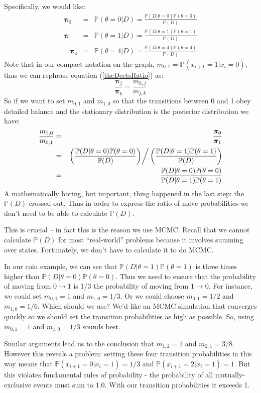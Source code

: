 \documentclass[11pt]{article}
\renewcommand{\Pr}{{\mathbb P}}
\begin{document}
Specifically, we would like:
\begin{eqnarray*}
	\bm \pi_0 & = & \Pr(\theta=0|D) =  \frac{\Pr(D|\theta=0)\Pr(\theta=0)}{\Pr(D)} \\
	\bm \pi_1 & = & \Pr(\theta=1|D) =  \frac{\Pr(D|\theta=1)\Pr(\theta=1)}{\Pr(D)} \\
	\ldots
	\bm \pi_4 & = & \Pr(\theta=4|D) =  \frac{\Pr(D|\theta=4)\Pr(\theta=4)}{\Pr(D)} 
\end{eqnarray*}
Note that in our compact notation on the graph, $m_{0,1} = \Pr(x_{i+1} = 1 | x_i = 0)$, thus we can rephrase equation (\ref{theDeetsRatio}) as:
$$	\frac{\bm \pi_j}{\bm \pi_k} = \frac{m_{k,j}}{m_{j,k}} $$
So if we want to set $m_{0,1}$ and $m_{1,0}$ so that the transitions between 0 and 1 obey detailed balance and the stationary distribution is the posterior distribution we have:
\begin{eqnarray*}
	\frac{m_{1,0}}{m_{0,1}} & = & \frac{\bm \pi_0}{\bm \pi_1} \\
		 & = & \left.\left(\frac{\Pr(D|\theta=0)\Pr(\theta=0)}{\Pr(D)}\right)\right/\left(\frac{\Pr(D|\theta=1)\Pr(\theta=1)}{\Pr(D)}\right) \\
		 & = & \frac{\Pr(D|\theta=0)\Pr(\theta=0)}{\Pr(D|\theta=1)\Pr(\theta=1)}
\end{eqnarray*}
A mathematically boring, but important, thing happened in the last step: the $\Pr(D)$ crossed out.
Thus in order to express the ratio of move probabilities we don't need to be able to calculate $\Pr(D)$.

This is crucial -- in fact this is the reason we use MCMC.  
Recall that we cannot calculate $\Pr(D)$ for most ``real-world'' problems because it involves summing over states.
Fortunately, we don't have to calculate it to do MCMC.

In our coin example, we can see that $\Pr(D|\theta=1)\Pr(\theta=1)$ is three times higher than $\Pr(D|\theta=0)\Pr(\theta=0)$.
Thus we need to ensure that the probability of moving from 0$\rightarrow 1$ is 1/3 the probability of moving from $1\rightarrow0$.
For instance, we could set $m_{0,1} = 1$ and $m_{1,0} = 1/3$.
Or we could choose $m_{0,1} = 1/2$ and $m_{1,0} = 1/6$.
Which should we use?  We'd like an MCMC simulation that converges quickly so we should set the transition probabilities as high as possible.
So, using $m_{0,1} = 1$ and $m_{1,0} = 1/3$ sounds best.

Similar arguments lead us to the conclusion that $m_{1,2} = 1$ and $m_{2,1} = 3/8$.
However this reveals a problem: setting these four transition probabilities in this way means that $\Pr(x_{i+1} = 0 |x_{i} = 1) = 1/3$ and $\Pr(x_{i+1} = 2 |x_{i} = 1) = 1$.
But this violates fundamental rules of probability - the probability of all mutually-exclusive events must sum to 1.0. 
With our transition probabilities it exceeds 1.
\end{document}

